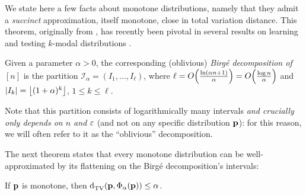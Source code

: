 We state here a few facts about monotone distributions, namely that they admit a \emph{succinct} approximation, itself monotone, close in total variation distance. This theorem, originally from \cite{Birge:87}, has recently been pivotal in several results on learning and testing $k$-modal distributions \cite{DDS:12,DDSVV:13}. 
\begin{definition}\label{def:birge:decomposition}
  Given a parameter $\alpha>0$, the corresponding (oblivious) \emph{Birg\'e decomposition of $[n]$} is the partition $\mathcal{I}_\alpha=(I_1,\dots,I_\ell)$, where $\ell=\bigO{\frac{\ln( \alpha n + 1)}{\alpha}}=\bigO{\frac{\log n }{\alpha}}$ and $\abs{I_{k}}=\flr{(1+\alpha)^k}$, $1\leq k \leq \ell$. 
\end{definition}
Note that this partition consists of logarithmically many intervals \emph{and crucially only depends on $n$ and $\eps$} (and not on any specific distribution $\D$): for this reason, we will often refer to it as the ``oblivious'' decomposition.

The next theorem states that every monotone distribution can be well-approximated by its flattening on the Birg\'e decomposition's intervals:     
\begin{theorem}\label{theorem:Birge:obl:decomp}
 If $\D$ is monotone, then $\totalvardist{\D}{\birge[\D]{\alpha}} \leq \alpha$.
\end{theorem}

